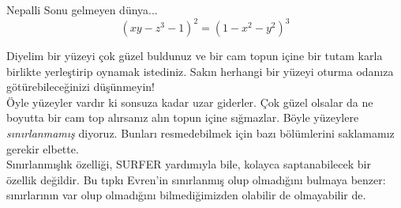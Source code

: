 \begin{surferPage}{Nepalli}
Sonu gelmeyen dünya... \\

\smallskip
\[(x y - z^3 -1)^2= (1 - x^2	- y^2)^3\]

\singlespacing
Diyelim bir yüzeyi çok güzel buldunuz ve bir cam topun içine bir tutam karla birlikte yerleştirip oynamak istediniz. Sakın herhangi bir yüzeyi oturma odanıza götürebileceğinizi düşünmeyin!
\\
\singlespacing
Öyle yüzeyler vardır ki sonsuza kadar uzar giderler. Çok güzel olsalar da ne boyutta bir cam top alırsanız alın topun içine sığmazlar.
Böyle yüzeylere \textit{sınırlanmamış} diyoruz. Bunları resmedebilmek için bazı bölümlerini saklamamız gerekir elbette.
\\
\singlespacing
Sınırlanmışlık özelliği, SURFER yardımıyla bile, kolayca saptanabilecek bir özellik değildir.
Bu tıpkı Evren'in sınırlanmış olup olmadığını bulmaya benzer: sınırlarının var olup olmadığını bilmediğimizden olabilir de olmayabilir de.
\end{surferPage}
